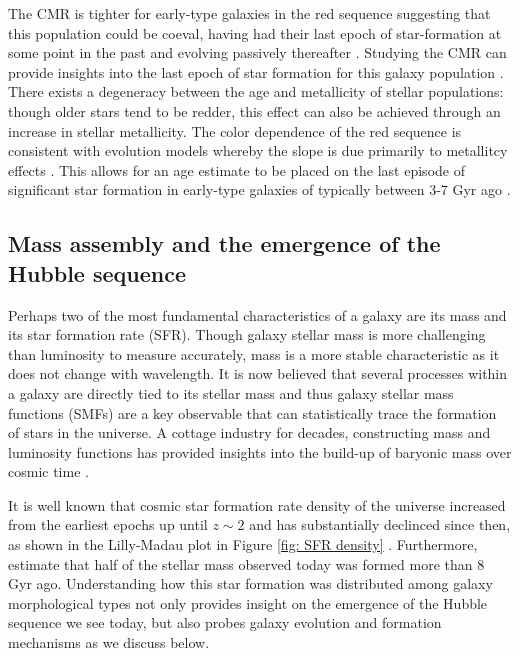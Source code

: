 The CMR is tighter for early-type galaxies in the red sequence suggesting that this population could be coeval, having had their last epoch of star-formation at some point in the past and evolving passively thereafter \citep{Bower1992}. Studying the CMR can provide insights into the last epoch of star formation for this galaxy population \citep{Sandage1978, Tully1982}. There exists a degeneracy between the age and metallicity of stellar populations: though older stars tend to be redder, this effect can also be achieved through an increase in stellar metallicity. The color dependence of the red sequence is consistent with evolution models whereby the slope is due primarily to metallitcy effects \citep{Bower1992, Kodama1997}. This allows for an age estimate to be placed on the last episode of significant star formation in early-type galaxies of typically between 3-7 Gyr ago \citep[e.g.,][]{LopezCruz2004}.%



\subsection{Mass assembly and the emergence of the Hubble sequence}

Perhaps two of the most fundamental characteristics of a galaxy are its mass and its star formation rate (SFR). Though galaxy stellar mass is more challenging than luminosity to measure accurately, mass is a more stable characteristic as it does not change with wavelength. It is now believed that several processes within a galaxy are directly tied to its stellar mass and thus galaxy stellar mass functions (SMFs) are a key observable that can statistically trace the formation of stars in the universe.  A cottage industry for decades, constructing mass and luminosity functions has provided insights into the build-up of baryonic mass over cosmic time \citep{Steidel1999,Ouchi2004,Giavalisco2004,Drory2005,Fontana2006,Marchesini2009,Caputi2011,Gonzalez2011,Lee2012,Ilbert2013,Bernardi2013,Duncan2014}. 


It is well known that cosmic star formation rate density of the universe increased from the earliest epochs up until $z\sim2$ and has substantially declinced since then, as shown in the Lilly-Madau plot in Figure \ref{fig: SFR density} \citep[and references therein]{Madau2014}. Furthermore, \cite{Madau2014} estimate that half of the stellar mass observed today was formed more than 8 Gyr ago. Understanding how this star formation was distributed among galaxy morphological types not only provides insight on the emergence of the Hubble sequence we see today, but also probes galaxy evolution and formation mechanisms as we discuss below.


